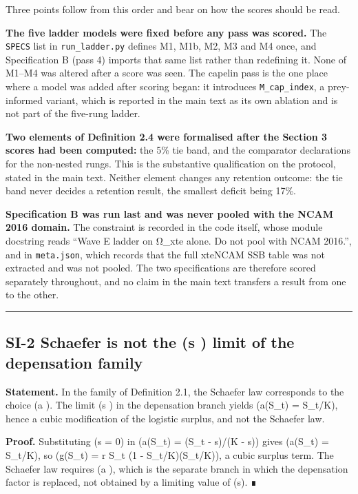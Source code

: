 \documentclass[11pt]{article}
\begin{document}
Three points follow from this order and bear on how the scores should be
read.

\textbf{The five ladder models were fixed before any pass was scored.}
The \texttt{SPECS} list in \texttt{run\_ladder.py} defines M1, M1b, M2,
M3 and M4 once, and Specification B (pass 4) imports that same list
rather than redefining it. None of M1--M4 was altered after a score was
seen. The capelin pass is the one place where a model was added after
scoring began: it introduces \texttt{M\_cap\_index}, a prey-informed
variant, which is reported in the main text as its own ablation and is
not part of the five-rung ladder.

\textbf{Two elements of Definition 2.4 were formalised after the Section
3 scores had been computed:} the 5\% tie band, and the comparator
declarations for the non-nested rungs. This is the substantive
qualification on the protocol, stated in the main text. Neither element
changes any retention outcome: the tie band never decides a retention
result, the smallest deficit being 17\%.

\textbf{Specification B was run last and was never pooled with the NCAM
2016 domain.} The constraint is recorded in the code itself, whose
module docstring reads ``Wave E ladder on Ω\_xte alone. Do not pool with
NCAM 2016.'', and in \texttt{meta.json}, which records that the full
xteNCAM SSB table was not extracted and was not pooled. The two
specifications are therefore scored separately throughout, and no claim
in the main text transfers a result from one to the other.

\begin{center}\rule{0.5\linewidth}{0.5pt}\end{center}

\subsection{\texorpdfstring{SI-2 Schaefer is not the (\mathfrak s )
limit of the depensation
family}{SI-2 Schaefer is not the (s ) limit of the depensation family}}\label{si-2-schaefer-is-not-the-s-limit-of-the-depensation-family}

\textbf{Statement.} In the family of Definition 2.1, the Schaefer law
corresponds to the choice (a ). The limit (\mathfrak s ) in
the depensation branch yields (a(S\_t) = S\_t/K), hence a cubic
modification of the logistic surplus, and not the Schaefer law.

\textbf{Proof.} Substituting (\mathfrak s = 0) in (a(S\_t) = (S\_t -
\mathfrak s)/(K - \mathfrak s)) gives (a(S\_t) = S\_t/K), so (g(S\_t) =
r S\_t (1 - S\_t/K)\cdot(S\_t/K)), a cubic surplus term. The Schaefer
law requires (a ), which is the separate branch in which the
depensation factor is replaced, not obtained by a limiting value of
(\mathfrak s). ∎
\end{document}
